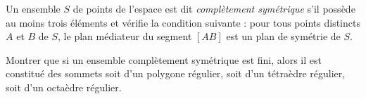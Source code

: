 Un ensemble $S$ de points de l'espace est dit \emph{complètement symétrique} s'il possède au moins trois éléments et vérifie la condition suivante : pour tous points distincts $A$ et $B$ de $S$, le plan médiateur du segment $[AB]$ est un plan de symétrie de $S$.

Montrer que si un ensemble complètement symétrique est fini, alors il est constitué des sommets soit d'un polygone régulier, soit d'un tétraèdre régulier, soit d'un octaèdre régulier.

